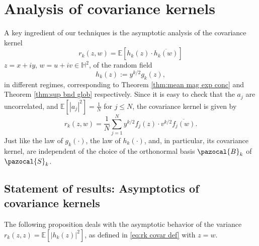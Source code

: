 \documentclass[12pt, a4paper]{amsart}
\theoremstyle{definition}
\newcommand {\E} {\mathbb{E}}
\newcommand {\1} {\mathbf{1}}
\newcommand {\Hb} {\mathbb {H}}
\newcommand {\Bc} {\pazocal {B}}
\newcommand{\Sc}{{\pazocal{S}}}
\numberwithin{equation}{section}
\begin{document}
\section{Analysis of covariance kernels}
\label{sec:covar est}

A key ingredient of our techniques is the asymptotic analysis of the covariance kernel
\begin{equation}
\label{eq:rk covar def}
r_{k}(z,w) = \E\left[h_{k}(z) \cdot \overline{h_{k}(w)} \right]
\end{equation}
$z=x+iy,\, w=u+iv \in \Hb^{2}$, of the random field
\begin{equation}
\label{eq:fk spher field def}
h_{k}(z):=y^{k/2}g_{k}(z),
\end{equation}
in different regimes, corresponding to Theorem \ref{thm:mean mag exp conc} and Theorem \ref{thm:sup bnd glob} respectively.
Since it is easy to check that the $a_{j}$ are uncorrelated, and $\E[|a_{j}|^{2}] =\frac{1}{N}$ for $j\le N$, the covariance kernel is given by
\begin{equation} \label{eq:rkdef}
r_{k}(z,w) = \frac{1}{N}\sum\limits_{j=1}^{N}y^{k/2}f_{j}(z)\cdot v^{k/2}\overline{f_{j}(w)}.
\end{equation}
Just like the law of $g_{k}(\cdot)$, the law of $h_{k}(\cdot)$, and, in particular, its covariance kernel, are independent of the choice of the orthonormal basis $\Bc_{k}$ of $\Sc_{k}$.




\subsection{Statement of results: Asymptotics of covariance kernels}

The following proposition deals with the asymptotic behavior of the variance $r_{k}(z,z)=\E\left[\left|h_{k}(z)\right|^{2}\right]$, as defined in \eqref{eq:rk covar def} with $z=w$.
\end{document}
